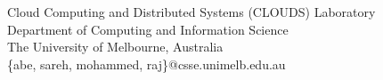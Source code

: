 Cloud Computing and Distributed Systems (CLOUDS) Laboratory\\
Department of Computing and Information Science\\
The University of Melbourne, Australia\\
\{abe, sareh, mohammed, raj\}@csse.unimelb.edu.au
